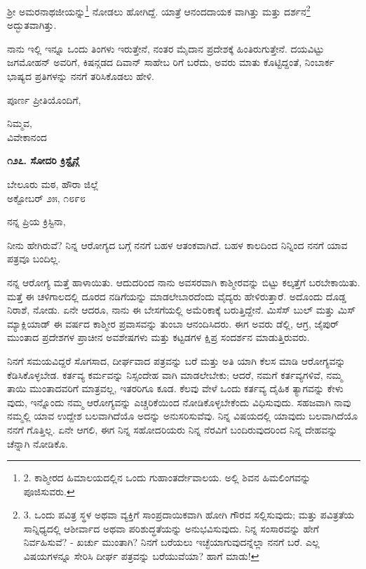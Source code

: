 ಶ‍್ರೀ ಅಮರನಾಥಜೀಯನ್ನು\footnote{2. ಕಾಶ್ಮೀರದ ಹಿಮಾಲಯದಲ್ಲಿನ ಒಂದು ಗುಹಾಂತರ್ದೇವಾಲಯ. ಅಲ್ಲಿ ಶಿವನ ಹಿಮಲಿಂಗವನ್ನು ಪೂಜಿಸುವರು.} ನೋಡಲು ಹೋಗಿದ್ದೆ. ಯಾತ್ರೆ ಆನಂದದಾಯಕ ವಾಗಿತ್ತು ಮತ್ತು ದರ್ಶನ\footnote{3. ಒಂದು ಪವಿತ್ರ ಸ್ಥಳ ಅಥವಾ ವ್ಯಕ್ತಿಗೆ ಸಾಂಪ್ರದಾಯಿಕವಾಗಿ ಹೋಗಿ ಗೌರವ ಸಲ್ಲಿಸುವುದು; ಮತ್ತು ಪವಿತ್ರತೆಯ ಸಾನ್ನಿಧ್ಯದಲ್ಲಿ ಆಶೀರ್ವಾದ ಅಥವಾ ಪರಿಶುದ್ಧತೆಯನ್ನು ಅನುಭವಿಸುವುದು. ನಿನ್ನ ಸಂಸಾರವನ್ನು ಹೇಗೆ ನಿರ್ವಹಿಸುವೆ? - ಖರ್ಚು ಮುಂತಾಗಿ? ನಿನಗೆ ಬರೆಯಲು ಇಚ್ಛೆಯಾಗುವುದನ್ನೆಲ್ಲಾ ನನಗೆ ಬರೆ. ಎಲ್ಲ ವಿಷಯಗಳನ್ನೂ ಸೇರಿಸಿ ದೀರ್ಘ ಪತ್ರವನ್ನು ಬರೆಯುವೆಯಾ? ಹಾಗೆ ಮಾಡು!} ಅದ್ಭುತವಾಗಿತ್ತು.

ನಾನು ಇಲ್ಲಿ ಇನ್ನೂ ಒಂದು ತಿಂಗಳು ಇರುತ್ತೇನೆ, ನಂತರ ಮೈದಾನ ಪ್ರದೇಶಕ್ಕೆ ಹಿಂತಿರುಗುತ್ತೇನೆ. ದಯವಿಟ್ಟು ಜಗಮೋಹನ್ ಅವರಿಗೆ, ಕಿಷನ್ಗಡದ ದಿವಾನ್ ಸಾಹೇಬ ರಿಗೆ ಬರೆದು, ಅವರು ಮಾತು ಕೊಟ್ಟಿದ್ದಂತೆ, ನಿಂಬಾರ್ಕ ಭಾಷ್ಯದ ಪ್ರತಿಗಳನ್ನು ನನಗೆ ತರಿಸಿಕೊಡಲು ಹೇಳಿ.

ಪೂರ್ಣ ಪ್ರೀತಿಯೊಂದಿಗೆ,

\begin{flushright}
ನಿಮ್ಮವ,\\ವಿವೇಕಾನಂದ
\end{flushright}

\begin{center}
\textbf{೧೨೭. ಸೋದರಿ ಕ್ರಿಸ್ಟೈನ್ಗೆ}
\end{center}

\begin{flushright}
ಬೇಲೂರು ಮಠ, ಹೌರಾ ಜಿಲ್ಲೆ\\ಅಕ್ಟೋಬರ್ ೨೫, ೧೮೯೮
\end{flushright}

ನನ್ನ ಪ್ರಿಯ ಕ್ರಿಸ್ಟಿನಾ,

ನೀನು ಹೇಗಿರುವೆ? ನಿನ್ನ ಆರೋಗ್ಯದ ಬಗ್ಗೆ ನನಗೆ ಬಹಳ ಆತಂಕವಾಗಿದೆ. ಬಹಳ ಕಾಲದಿಂದ ನಿನ್ನಿಂದ ನನಗೆ ಯಾವ ಪತ್ರವೂ ಬಂದಿಲ್ಲ.

ನನ್ನ ಆರೋಗ್ಯ ಮತ್ತೆ ಹಾಳಾಯಿತು. ಆದುದರಿಂದ ನಾನು ಅವಸರವಾಗಿ ಕಾಶ್ಮೀರವನ್ನು ಬಿಟ್ಟು ಕಲ್ಕತ್ತೆಗೆ ಬರಬೇಕಾಯಿತು. ಮತ್ತೆ ಈ ಚಳಿಗಾಲದಲ್ಲಿ ದೂರದ ನಡಿಗೆಯನ್ನು ಮಾಡಲೇಬಾರದೆಂದು ವೈದ್ಯರು ಹೇಳಿರುತ್ತಾರೆ. ಅದೊಂದು ದೊಡ್ಡ ನಿರಾಶೆ, ನೋಡು. ಏನೇ ಆದರೂ, ನಾನು ಈ ಬೇಸಗೆಯಲ್ಲಿ ಅಮೆರಿಕಾಕ್ಕೆ ಬರುತ್ತಿದ್ದೇನೆ. ಮಿಸೆಸ್ ಬುಲ್ ಮತ್ತು ಮಿಸ್ ಮ್ಯಾಕ್ಲಿಯಾಡ್ ಈ ವರ್ಷದ ಕಾಶ್ಮೀರ ಪ್ರವಾಸವನ್ನು ತುಂಬಾ ಆನಂದಿಸಿದರು. ಈಗ ಅವರು ಡೆಲ್ಲಿ, ಆಗ್ರ, ಜೈಪುರ್ ಮುಂತಾದ ಪ್ರದೇಶಗಳ ಪ್ರಾಚೀನ ಅವಶೇಷಗಳು ಮತ್ತು ಕಟ್ಟಡಗಳ ಕ್ಷಿಪ್ರ ಸಂದರ್ಶನ ಮಾಡುತ್ತಿರುವರು.

ನಿನಗೆ ಸಮಯವಿದ್ದರೆ ಸೊಗಸಾದ, ದೀರ್ಘವಾದ ಪತ್ರವನ್ನು ಬರೆ ಮತ್ತು ಅತಿ ಯಾಗಿ ಕೆಲಸ ಮಾಡಿ ಆರೋಗ್ಯವನ್ನು ಕೆಡಿಸಿಕೊಳ್ಳಬೇಡ. ಕರ್ತವ್ಯ ಕರ್ಮವನ್ನು ನಿಸ್ಸಂದೇಹ ವಾಗಿ ಮಾಡಲೇಬೇಕು; ಆದರೆ, ನಮಗೆ ಕರ್ತವ್ಯಗಳಿವೆ, ನಮ್ಮ ತಾಯಿ ಮುಂತಾದವರಿಗೆ ಮಾತ್ರವಲ್ಲ, ಇತರರಿಗೂ ಕೂಡ. ಕೆಲವು ವೇಳೆ ಒಂದು ಕರ್ತವ್ಯ ದೈಹಿಕ ತ್ಯಾಗವನ್ನು ಕೇಳು ವುದು, ಇನ್ನೊಂದು ನಮ್ಮ ಆರೋಗ್ಯವನ್ನು ಎಚ್ಚರಿಕೆಯಿಂದ ನೋಡಿಕೊಳ್ಳಬೇಕೆಂದು ವಿಧಿಸುವುದು. ಸಹಜವಾಗಿ ನಾವು ನಮ್ಮಲ್ಲಿ ಯಾವ ಉದ್ದೇಶ ಬಲವಾಗಿದೆಯೊ ಅದನ್ನು ಅನುಸರಿಸುವೆವು. ನಿನ್ನ ವಿಷಯದಲ್ಲಿ ಯಾವುದು ಬಲವಾಗಿದೆಯೊ ನನಗೆ ಗೊತ್ತಿಲ್ಲ. ಏನೇ ಆಗಲಿ, ಈಗ ನಿನ್ನ ಸಹೋದರಿಯರು ನಿನ್ನ ನೆರವಿಗೆ ಬಂದಿರುವುದರಿಂದ ನಿನ್ನ ದೇಹವನ್ನು ಚೆನ್ನಾಗಿ ನೋಡಿಕೊ.

